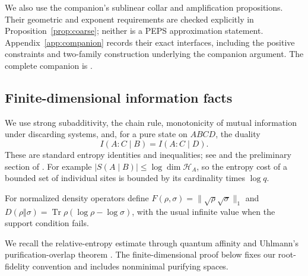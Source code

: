 \documentclass[11pt]{article}
\numberwithin{equation}{section}
\theoremstyle{definition}
\theoremstyle{remark}
\DeclareMathOperator{\Tr}{Tr}
\newcommand{\norm}[1]{\lVert #1\rVert}
\begin{document}
We also use the companion's sublinear collar and amplification propositions.
Their geometric and exponent requirements are checked explicitly in
Proposition~\ref{prop:coarse}; neither is a PEPS approximation statement.
Appendix~\ref{app:companion} records their exact interfaces, including the
positive constraints and two-family construction underlying the companion
argument. The complete companion is \cite{RepoAreaLaw}.

\subsection{Finite-dimensional information facts}

We use strong subadditivity, the chain rule, monotonicity of mutual
information under discarding systems, and, for a pure state on $ABCD$,
the duality
\[
 I(A:C\mid B)=I(A:C\mid D).
\]
These are standard entropy identities and inequalities; see
\cite{LiebRuskai1973} and the preliminary section of \cite{RepoAreaLaw}.
For example $|S(A\mid B)|\le\log\dim\mathcal H_A$, so the entropy cost
of a bounded set of individual sites is bounded by its cardinality times
$\log q$.

For normalized density operators define
$F(\rho,\sigma)=\norm{\sqrt\rho\sqrt\sigma}_1$ and
$D(\rho\Vert\sigma)=\Tr\rho(\log\rho-\log\sigma)$, with the usual
infinite value when the support condition fails.

We recall the relative-entropy estimate through quantum affinity
\cite[Equation~(2.9)]{CarlenLieb2014} and Uhlmann's purification-overlap
theorem \cite[Sections~2 and~5]{Uhlmann1976}. The finite-dimensional proof
below fixes our root-fidelity convention and includes nonminimal purifying
spaces.
\end{document}
